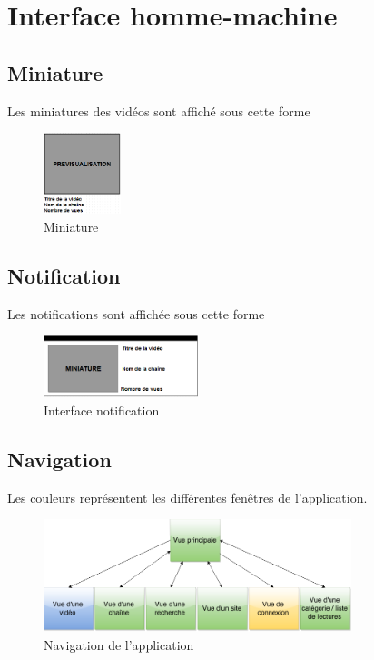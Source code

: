 \documentclass[11pt]{report} %
\begin{document}
			\newpage
	
	\section{Interface homme-machine}
		\subsection{Miniature}
		Les miniatures des vidéos sont affiché sous cette forme
		\begin{figure}[h]
			\center
			\includegraphics[width=0.2\textwidth]{../img/Miniature.png}
			\caption{Miniature}
			\label{Miniature}
		\end{figure}
		
		\subsection{Notification}
		Les notifications sont affichée sous cette forme
		\begin{figure}[h]
			\center
			\includegraphics[width=0.4\textwidth]{../img/NotificationInterface.png}
			\caption{Interface notification}
			\label{notification}
		\end{figure}
		
		\subsection{Navigation}
		Les couleurs représentent les différentes fenêtres de l'application.
		
		\begin{figure}[h]
			\center
			\includegraphics[width=0.8\textwidth]{../img/navigation.png}
			\caption{Navigation de l'application}
			\label{navigation}
		\end{figure}
		
\end{document}
